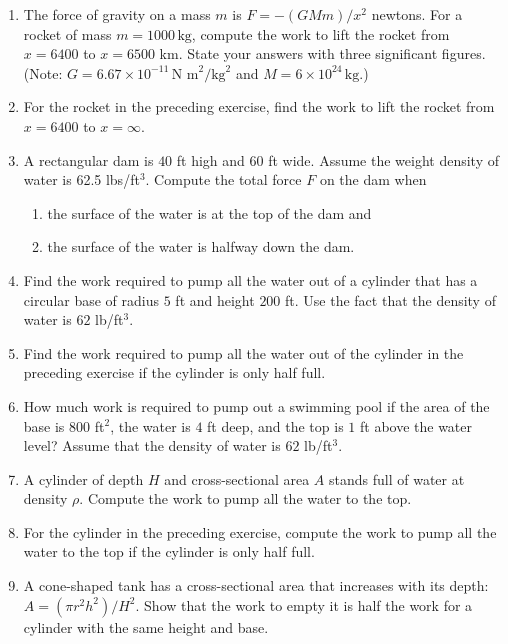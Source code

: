 \documentclass{exercises}
\begin{document}
\begin{enumerate}[resume]
\item \techrequired The force of gravity on a mass $m$ is $F=-(GMm)/x^{2}$ newtons. For a rocket of mass $m=1000\,\text{kg}$, compute the work to lift the rocket from $x=6400$ to $x=6500$ km. State your answers with three significant figures. (Note: $G=6.67\times 10^{-11}\,\text{N m}^{2}/\text{kg}^{2}$ and $M=6\times 10^{24}\,\text{kg}$.)
\item \techrequired For the rocket in the preceding exercise, find the work to lift the rocket from $x=6400$ to $x=\infty$.
\item \techrequired A rectangular dam is $40$ ft high and $60$ ft wide. Assume the weight density of water is 62.5 lbs/ft$^{3}$. Compute the total force $F$ on the dam when
\begin{enumerate}[label=(\alph*)]
  \item the surface of the water is at the top of the dam and
  \item the surface of the water is halfway down the dam.
\end{enumerate}
\item \techrequired Find the work required to pump all the water out of a cylinder that has a circular base of radius $5$ ft and height $200$ ft. Use the fact that the density of water is $62$ lb/ft$^{3}$.
\item \techrequired Find the work required to pump all the water out of the cylinder in the preceding exercise if the cylinder is only half full.
\item \techrequired How much work is required to pump out a swimming pool if the area of the base is $800$ ft$^{2}$, the water is $4$ ft deep, and the top is $1$ ft above the water level? Assume that the density of water is $62$ lb/ft$^{3}$.
\item A cylinder of depth $H$ and cross-sectional area $A$ stands full of water at density $\rho$. Compute the work to pump all the water to the top.
\item For the cylinder in the preceding exercise, compute the work to pump all the water to the top if the cylinder is only half full.
\item A cone-shaped tank has a cross-sectional area that increases with its depth: $A=(\pi r^{2}h^{2})/H^{2}$. Show that the work to empty it is half the work for a cylinder with the same height and base.
\end{enumerate}
\end{document}
